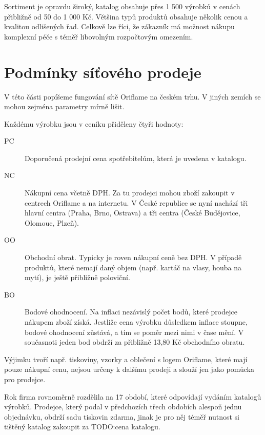 \documentclass[a4wide,12pt]{report}
\begin{document}
Sortiment je opravdu široký, katalog obsahuje přes 1 500 výrobků v cenách přibližně od 50 do 1 000 Kč. Většina typů produktů obsahuje několik cenou a kvalitou odlišených řad. Celkově lze říci, že zákazník má možnost nákupu komplexní péče s téměř libovolným rozpočtovým omezením.
\section{Podmínky síťového prodeje}
V této části popíšeme fungování sítě Oriflame na českém trhu. V jiných zemích se mohou zejména parametry mírně lišit.

Každému výrobku jsou v ceníku přiděleny čtyři hodnoty:
\begin{description}
\item[PC] Doporučená prodejní cena spotřebitelům, která je uvedena v katalogu.
\item[NC] Nákupní cena včetně DPH. Za tu prodejci mohou zboží zakoupit v centrech Oriflame a na internetu. V České republice se nyní nachází tři hlavní centra (Praha, Brno, Ostrava) a tři centra (České Budějovice, Olomouc, Plzeň).
\item[OO] Obchodní obrat. Typicky je roven nákupní ceně bez DPH. V případě produktů, které nemají daný objem (např. kartáč na vlasy, houba na mytí), je ještě přibližně poloviční.
\item[BO] Bodové ohodnocení. Na inflaci nezávislý počet bodů, které prodejce nákupem zboží získá. Jestliže cena výrobku důsledkem inflace stoupne, bodové ohodnocení zůstává, a tím se poměr mezi nimi v čase mění. V současnoti jeden bod obdrží za přibližně 13,80 Kč obchodního obratu.
\end{description}
Výjimku tvoří např. tiskoviny, vzorky a oblečení s logem Oriflame, které mají pouze nákupní cenu,  nejsou určeny k dalšímu prodeji a slouží jen jako pomůcka pro prodejce.

Rok firma rovnoměrně rozdělila na 17 období, které odpovídají vydáním katalogů výrobků. Prodejce, který podal v předchozích třech obdobích alespoň jednu objednávku, obdrží sadu tiskovin zdarma, jinak je pro něj téměř nutnost si tištěný katalog zakoupit za TODO:cena katalogu.
\end{document}
